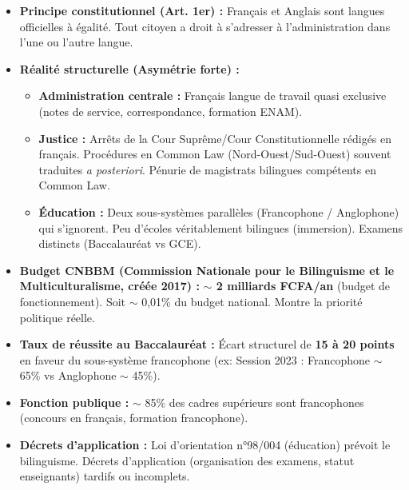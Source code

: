 \documentclass[11pt]{article}
\begin{document}
\begin{definition}
\begin{itemize}
    \item \textbf{Principe constitutionnel (Art. 1er) :} Français et Anglais sont langues officielles à égalité. Tout citoyen a droit à s'adresser à l'administration dans l'une ou l'autre langue.
    \item \textbf{Réalité structurelle (Asymétrie forte) :}
    \begin{itemize}
        \item \textbf{Administration centrale :} Français langue de travail quasi exclusive (notes de service, correspondance, formation ENAM).
        \item \textbf{Justice :} Arrêts de la Cour Suprême/Cour Constitutionnelle rédigés en français. Procédures en Common Law (Nord-Ouest/Sud-Ouest) souvent traduites \emph{a posteriori}. Pénurie de magistrats bilingues compétents en Common Law.
        \item \textbf{Éducation :} Deux sous-systèmes parallèles (Francophone / Anglophone) qui s'ignorent. Peu d'écoles véritablement bilingues (immersion). Examens distincts (Baccalauréat vs GCE).
    \end{itemize}
\end{itemize}
\end{definition}

\begin{exemplebox}
\begin{itemize}
    \item \textbf{Budget CNBBM (Commission Nationale pour le Bilinguisme et le Multiculturalisme, créée 2017) :} \textbf{$\sim$ 2 milliards FCFA/an} (budget de fonctionnement). Soit $\sim$ 0,01\% du budget national. Montre la priorité politique réelle.
    \item \textbf{Taux de réussite au Baccalauréat :} Écart structurel de \textbf{15 à 20 points} en faveur du sous-système francophone (ex: Session 2023 : Francophone $\sim$ 65\% vs Anglophone $\sim$ 45\%).
    \item \textbf{Fonction publique :} $\sim$ 85\% des cadres supérieurs sont francophones (concours en français, formation francophone).
    \item \textbf{Décrets d'application :} Loi d'orientation n°98/004 (éducation) prévoit le bilinguisme. Décrets d'application (organisation des examens, statut enseignants) tardifs ou incomplets.
\end{itemize}
\end{exemplebox}
\end{document}
